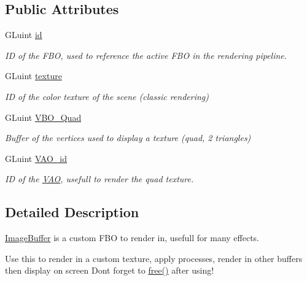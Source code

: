 \subsection*{Public Attributes}
\begin{DoxyCompactItemize}
\item 
G\+Luint \hyperlink{struct_render_1_1_low_level_wrapper_1_1_image_buffer_aa80751e306136b688c65650875660574}{id}
\begin{DoxyCompactList}\small\item\em ID of the F\+BO, used to reference the active F\+BO in the rendering pipeline. \end{DoxyCompactList}\item 
G\+Luint \hyperlink{struct_render_1_1_low_level_wrapper_1_1_image_buffer_adb265560e8967a5b5d8339e153286365}{texture}
\begin{DoxyCompactList}\small\item\em ID of the color texture of the scene (classic rendering) \end{DoxyCompactList}\item 
G\+Luint \hyperlink{struct_render_1_1_low_level_wrapper_1_1_image_buffer_ac231ffe2cf0accdcb974c20b7841dd31}{V\+B\+O\+\_\+\+Quad}
\begin{DoxyCompactList}\small\item\em Buffer of the vertices used to display a texture (quad, 2 triangles) \end{DoxyCompactList}\item 
G\+Luint \hyperlink{struct_render_1_1_low_level_wrapper_1_1_image_buffer_aa2b457fff3f2bf7dc83fc503cbdfce11}{V\+A\+O\+\_\+id}
\begin{DoxyCompactList}\small\item\em ID of the \hyperlink{struct_render_1_1_low_level_wrapper_1_1_v_a_o}{V\+AO}, usefull to render the quad texture. \end{DoxyCompactList}\end{DoxyCompactItemize}


\subsection{Detailed Description}
\hyperlink{struct_render_1_1_low_level_wrapper_1_1_image_buffer}{Image\+Buffer} is a custom F\+BO to render in, usefull for many effects. 

Use this to render in a custom texture, apply processes, render in other buffers then display on screen Don\textquotesingle{}t forget to \hyperlink{struct_render_1_1_low_level_wrapper_1_1_image_buffer_a97e967ed4dd863d8c7ebd2f1dc6241e8}{free()} after using! 

